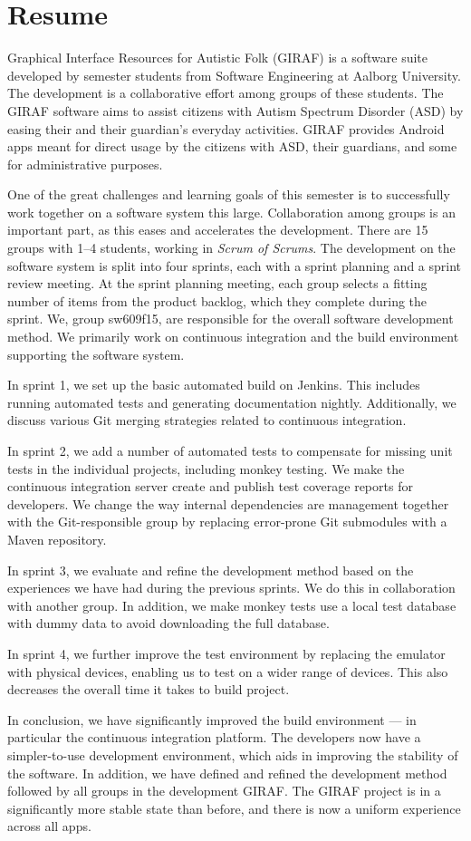 \chapter*{Resume}
Graphical Interface Resources for Autistic Folk (GIRAF) is a software suite developed by  semester students from Software Engineering at Aalborg University. The development is a collaborative effort among groups of these students. The GIRAF software aims to assist citizens with Autism Spectrum Disorder (ASD) by easing their and their guardian's everyday activities. GIRAF provides Android apps meant for direct usage by the citizens with ASD, their guardians, and some for administrative purposes.

One of the great challenges and learning goals of this semester is to successfully work together on a software system this large. Collaboration among groups is an important part, as this eases and accelerates the development. There are 15 groups with 1--4 students, working in \emph{Scrum of Scrums}. The development on the software system is split into four sprints, each with a sprint planning and a sprint review meeting. At the sprint planning meeting, each group selects a fitting number of items from the product backlog, which they complete during the sprint. We, group sw609f15, are responsible for the overall software development method. We primarily work on continuous integration and the build environment supporting the software system.

In sprint 1, we set up the basic automated build on Jenkins. This includes running automated tests and generating documentation nightly. Additionally, we discuss various Git merging strategies related to continuous integration.

In sprint 2, we add a number of automated tests to compensate for missing unit tests in the individual projects, including monkey testing. We make the continuous integration server create and publish test coverage reports for developers. We change the way internal dependencies are management together with the Git-responsible group by replacing error-prone Git submodules with a Maven repository.

In sprint 3, we evaluate and refine the development method based on the experiences we have had during the previous sprints. We do this in collaboration with another group. In addition, we make monkey tests use a local test database with dummy data to avoid downloading the full database.

In sprint 4, we further improve the test environment by replacing the emulator with physical devices, enabling us to test on a wider range of devices. This also decreases the overall time it takes to build project.

In conclusion, we have significantly improved the build environment --- in particular the continuous integration platform. The developers now have a simpler-to-use development environment, which aids in improving the stability of the software. In addition, we have defined and refined the development method followed by all groups in the development GIRAF. The GIRAF project is in a significantly more stable state than before, and there is now a uniform experience across all apps.
